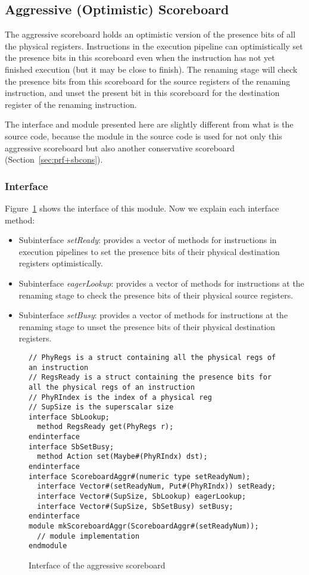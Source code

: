 \subsection{Aggressive (Optimistic) Scoreboard}\label{sec:sbaggr}

The aggressive scoreboard holds an optimistic version of the presence bits of all the physical registers.
Instructions in the execution pipeline can optimistically set the presence bits in this scoreboard even when the instruction has not yet finished execution (but it may be close to finish).
The renaming stage will check the presence bits from this scoreboard for the source registers of the renaming instruction, and unset the present bit in this scoreboard for the destination register of the renaming instruction.

The interface and module presented here are slightly different from what is the source code, because the module in the source code is used for not only this aggressive scoreboard but also another conservative scoreboard (Section~\ref{sec:prf+sbcons}).

\subsubsection{Interface}
Figure~\ref{fig:aggr-sb-ifc} shows the interface of this module.
Now we explain each interface method: 
\begin{itemize}
    \item Subinterface \emph{setReady}: provides a vector of methods for instructions in execution pipelines to set the presence bits of their physical destination registers optimistically.
    \item Subinterface \emph{eagerLookup}: provides a vector of methods for instructions at the renaming stage to check the presence bits of their physical source registers.
    \item Subinterface \emph{setBusy}: provides a vector of methods for instructions at the renaming stage to unset the presence bits of their physical destination registers.
\end{itemize}

\begin{figure}
\begin{lstlisting}[caption={}]
// PhyRegs is a struct containing all the physical regs of an instruction
// RegsReady is a struct containing the presence bits for all the physical regs of an instruction
// PhyRIndex is the index of a physical reg
// SupSize is the superscalar size
interface SbLookup;
  method RegsReady get(PhyRegs r);
endinterface
interface SbSetBusy;
  method Action set(Maybe#(PhyRIndx) dst);
endinterface
interface ScoreboardAggr#(numeric type setReadyNum);
  interface Vector#(setReadyNum, Put#(PhyRIndx)) setReady;
  interface Vector#(SupSize, SbLookup) eagerLookup;
  interface Vector#(SupSize, SbSetBusy) setBusy;
endinterface
module mkScoreboardAggr(ScoreboardAggr#(setReadyNum));
  // module implementation
endmodule
\end{lstlisting}
\caption{Interface of the aggressive scoreboard}\label{fig:aggr-sb-ifc}
\end{figure}

